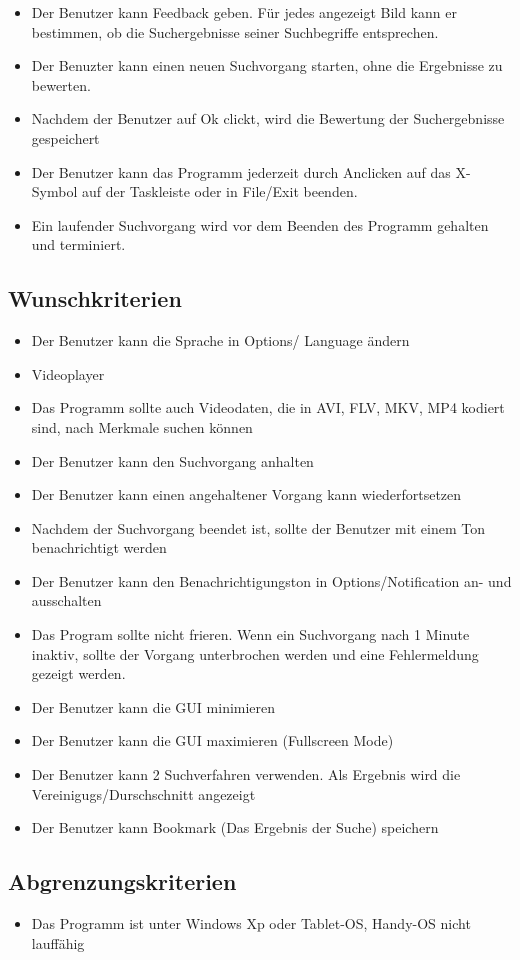 \begin{itemize}
\item Der Benutzer kann Feedback geben. Für jedes angezeigt Bild kann er bestimmen, ob die Suchergebnisse seiner Suchbegriffe entsprechen. 
\item Der Benuzter kann einen neuen Suchvorgang starten, ohne die Ergebnisse zu bewerten.
\item Nachdem der Benutzer auf Ok clickt, wird die Bewertung der Suchergebnisse gespeichert
\item Der Benutzer kann das Programm jederzeit durch Anclicken auf das X-Symbol auf der Taskleiste oder in File/Exit beenden. 
\item Ein laufender Suchvorgang wird vor dem Beenden des Programm gehalten und terminiert.
\end{itemize}
\subsection{Wunschkriterien}
\begin{itemize}
\item Der Benutzer kann die Sprache in Options/ Language ändern
\item Videoplayer
\item Das Programm sollte auch Videodaten, die in AVI, FLV, MKV, MP4 kodiert sind, nach Merkmale suchen können
\item Der Benutzer kann den Suchvorgang anhalten
\item Der Benutzer kann einen angehaltener Vorgang kann wiederfortsetzen
\item Nachdem der Suchvorgang beendet ist, sollte der Benutzer mit einem Ton benachrichtigt werden
\item Der Benutzer kann den Benachrichtigungston in Options/Notification an- und ausschalten 
\item Das Program sollte nicht frieren. Wenn ein Suchvorgang nach 1 Minute inaktiv, sollte der Vorgang unterbrochen werden und eine Fehlermeldung gezeigt werden.
\item Der Benutzer kann die GUI minimieren
\item Der Benutzer kann die GUI maximieren (Fullscreen Mode) 
\item Der Benutzer kann 2 Suchverfahren verwenden. Als Ergebnis wird die Vereinigugs/Durschschnitt angezeigt
\item Der Benutzer kann Bookmark (Das Ergebnis der Suche) speichern 
\end{itemize}
\subsection{Abgrenzungskriterien}
\begin{itemize}
\item Das Programm ist unter Windows Xp oder Tablet-OS, Handy-OS nicht lauffähig
\end{itemize}
